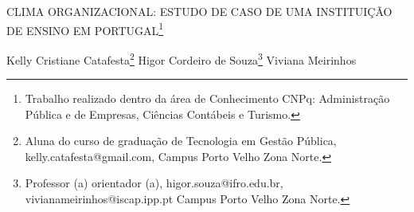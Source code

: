 \documentclass[article,12pt,onesidea,4paper,english,brazil]{abntex2}
\begin{document}
	
	
	\frenchspacing 
	
	\begin{center}
		\LARGE CLIMA ORGANIZACIONAL: ESTUDO DE CASO DE UMA INSTITUIÇÃO DE ENSINO EM PORTUGAL\footnote{Trabalho realizado dentro da área de Conhecimento CNPq: Administração Pública e de Empresas, Ciências Contábeis e Turismo.}
		
		\normalsize
		Kelly Cristiane Catafesta\footnote{Aluna do curso de graduação de Tecnologia em Gestão Pública, kelly.catafesta@gmail.com, Campus Porto Velho Zona Norte.} 
		Higor Cordeiro de Souza\footnote{Professor (a) orientador (a), higor.souza@ifro.edu.br, vivianameirinhos@iscap.ipp.pt Campus Porto Velho Zona Norte.} 
		Viviana Meirinhos
		
	\end{center}
	
\end{document}
